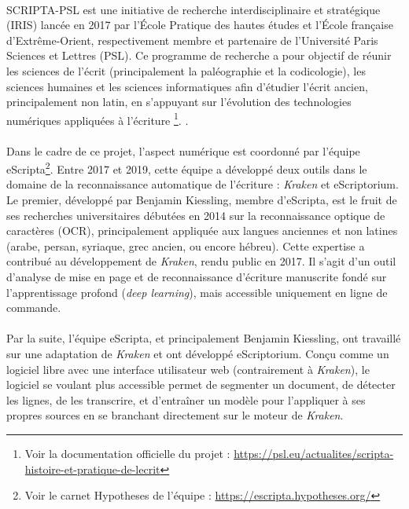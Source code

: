 \documentclass[a4paper,12pt,twoside]{book}
\begin{document}
\paragraph{}
SCRIPTA-PSL est une initiative de recherche interdisciplinaire et stratégique (IRIS) lancée en 2017 par l’École Pratique des hautes études et l’École française d’Extrême-Orient, respectivement membre et partenaire de l’Université Paris Sciences et Lettres (PSL). Ce programme de recherche a pour objectif de réunir les sciences de l’écrit (principalement la paléographie et la codicologie), les sciences humaines et les sciences informatiques afin d’étudier l’écrit ancien, principalement non latin, en s’appuyant sur l’évolution des technologies numériques appliquées à l’écriture \footnote{Voir la documentation officielle du projet : \url{https://psl.eu/actualites/scripta-histoire-et-pratique-de-lecrit}}. .

\paragraph{}
Dans le cadre de ce projet, l’aspect numérique est coordonné par l’équipe eScripta\footnote{Voir le carnet Hypotheses de l'équipe : \url{https://escripta.hypotheses.org/}}. Entre 2017 et 2019, cette équipe a développé deux outils dans le domaine de la reconnaissance automatique de l’écriture : \textit{Kraken} et eScriptorium. Le premier, développé par Benjamin Kiessling, membre d’eScripta, est le fruit de ses recherches universitaires débutées en 2014 sur la reconnaissance optique de caractères (OCR), principalement appliquée aux langues anciennes et non latines (arabe, persan, syriaque, grec ancien, ou encore hébreu). Cette expertise a contribué au développement de \textit{Kraken}, rendu public en 2017. Il s’agit d’un outil d’analyse de mise en page et de reconnaissance d’écriture manuscrite fondé sur l’apprentissage profond (\textit{deep learning}), mais accessible uniquement en ligne de commande.

\paragraph{}
Par la suite, l’équipe eScripta, et principalement Benjamin Kiessling, ont travaillé sur une adaptation de \textit{Kraken} et ont développé eScriptorium. Conçu comme un logiciel libre avec une interface utilisateur web (contrairement à \textit{Kraken}), le logiciel se voulant plus accessible permet de segmenter un document, de détecter les lignes, de les transcrire, et d’entraîner un modèle pour l’appliquer à ses propres sources en se branchant directement sur le moteur de \textit{Kraken}.
\end{document}
